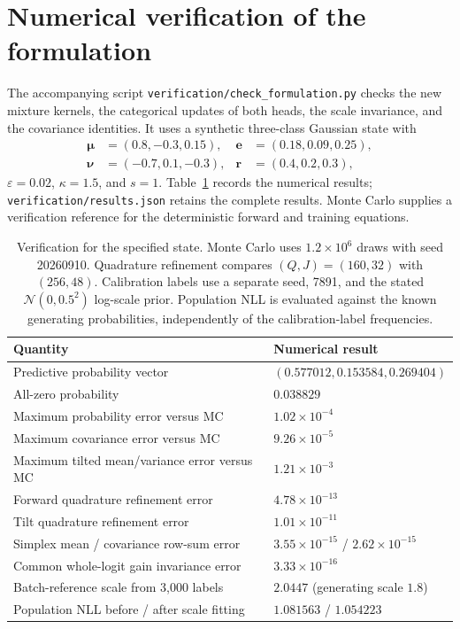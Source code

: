 \documentclass[letterpaper]{article}
\newcommand{\Normal}{\mathcal N}
\begin{document}
\section{Numerical verification of the formulation}\label{S:checks}
The accompanying script \texttt{verification/check\_formulation.py} checks the new mixture kernels, the categorical updates of both heads, the scale invariance, and the covariance identities. It uses a synthetic three-class Gaussian state with
\begin{align}
\bm\mu&=(0.8,-0.3,0.15),&\bm e&=(0.18,0.09,0.25),\\
\bm\nu&=(-0.7,0.1,-0.3),&\bm r&=(0.4,0.2,0.3),
\end{align}
$\varepsilon=0.02$, $\kappa=1.5$, and $s=1$. Table~\ref{T:checks} records the numerical results; \texttt{verification/results.json} retains the complete results. Monte Carlo supplies a verification reference for the deterministic forward and training equations.
\begin{table}[H]
\centering\small
\begin{tabular}{@{}p{}p{}@{}}
\toprule
Quantity & Numerical result \\
\midrule
Predictive probability vector & $(0.577012, 0.153584, 0.269404)$ \\
All-zero probability & $0.038829$ \\
Maximum probability error versus MC & $1.02\times10^{-4}$ \\
Maximum covariance error versus MC & $9.26\times10^{-5}$ \\
Maximum tilted mean/variance error versus MC & $1.21\times10^{-3}$ \\
Forward quadrature refinement error & $4.78\times10^{-13}$ \\
Tilt quadrature refinement error & $1.01\times10^{-11}$ \\
Simplex mean / covariance row-sum error & $3.55\times10^{-15}$ / $2.62\times10^{-15}$ \\
Common whole-logit gain invariance error & $3.33\times10^{-16}$ \\
Batch-reference scale from 3,000 labels & $2.0447$ (generating scale $1.8$) \\
Population NLL before / after scale fitting & $1.081563$ / $1.054223$ \\
\bottomrule
\end{tabular}
\caption{Verification for the specified state. Monte Carlo uses $1.2\times10^6$ draws with seed 20260910. Quadrature refinement compares $(Q,J)=(160,32)$ with $(256,48)$. Calibration labels use a separate seed, 7891, and the stated $\Normal(0,0.5^2)$ log-scale prior. Population NLL is evaluated against the known generating probabilities, independently of the calibration-label frequencies.}
\label{T:checks}
\end{table}
\end{document}
